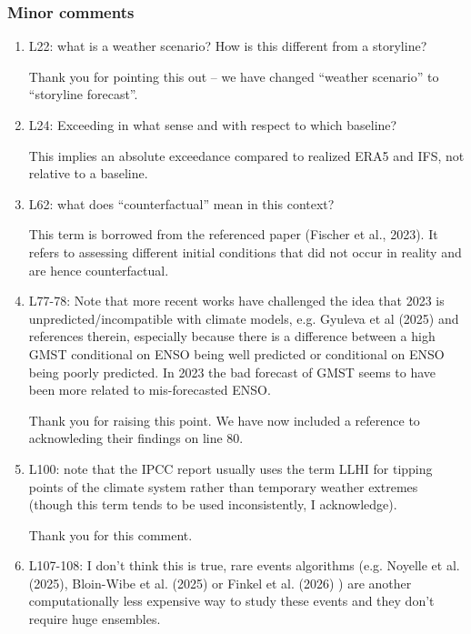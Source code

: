 \documentclass[11pt]{article}
\newcommand{\newTxt}{\textcolor{cadmiumgreen}}
\begin{document}
\subsubsection*{Minor comments}

\begin{enumerate}
    \item  L22: what is a weather scenario? How is this different from a storyline?

    \newTxt{Thank you for pointing this out -- we have changed ``weather scenario'' to ``storyline forecast''.}
    
    \item L24: Exceeding in what sense and with respect to which baseline?

    \newTxt{This implies an absolute exceedance compared to realized ERA5 and IFS, not relative to a baseline.}
    
    \item L62: what does “counterfactual” mean in this context?

    \newTxt{This term is borrowed from the referenced paper (Fischer et al., 2023). It refers to assessing different initial conditions that did not occur in reality and are hence counterfactual.}
    
    \item L77-78: Note that more recent works have challenged the idea that 2023 is unpredicted/incompatible with climate models, e.g. Gyuleva et al (2025) and references therein, especially because there is a difference between a high GMST conditional on ENSO being well predicted or conditional on ENSO being poorly predicted. In 2023 the bad forecast of GMST seems to have been more related to mis-forecasted ENSO.

    \newTxt{Thank you for raising this point. We have now included a reference to \cite{Gyuleva2025} acknowleding their findings on line 80.}

    \item L100: note that the IPCC report usually uses the term LLHI for tipping points of the climate system rather than temporary weather extremes (though this term tends to be used inconsistently, I acknowledge).

    \newTxt{Thank you for this comment.}

    \item L107-108: I don’t think this is true, rare events algorithms (e.g. Noyelle et al. (2025), Bloin-Wibe et al. (2025) or Finkel et al. (2026) ) are another computationally less expensive way to study these events and they don’t require huge ensembles.


\end{enumerate}
\end{document}
